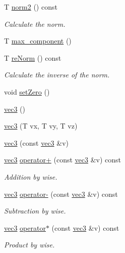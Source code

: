\begin{DoxyCompactItemize}
T \mbox{\hyperlink{struct_space_h_1_1vec3_a62dcbdc184d4228da839845c7e179eea}{norm2}} () const
\begin{DoxyCompactList}\small\item\em Calculate the norm. \end{DoxyCompactList}\item 
T \mbox{\hyperlink{struct_space_h_1_1vec3_a5bf7ae47f97a2269748d66933d719bd9}{max\+\_\+component}} ()
\item 
T \mbox{\hyperlink{struct_space_h_1_1vec3_a90d3f8ac98cf17cb20986997daaf9e0e}{re\+Norm}} () const
\begin{DoxyCompactList}\small\item\em Calculate the inverse of the norm. \end{DoxyCompactList}\item 
void \mbox{\hyperlink{struct_space_h_1_1vec3_ad2e7b91b843f84633372857718f1b5ba}{set\+Zero}} ()
\item 
\mbox{\hyperlink{struct_space_h_1_1vec3_adaeadb1aa964e9f603d2d2402bc0e29a}{vec3}} ()
\item 
\mbox{\hyperlink{struct_space_h_1_1vec3_a9441fda82b87e8b91167dc6e5e3039a2}{vec3}} (T vx, T vy, T vz)
\item 
\mbox{\hyperlink{struct_space_h_1_1vec3_ae3f72473af782f642108ed5c87263657}{vec3}} (const \mbox{\hyperlink{struct_space_h_1_1vec3}{vec3}} \&v)
\item 
\mbox{\hyperlink{struct_space_h_1_1vec3}{vec3}} \mbox{\hyperlink{struct_space_h_1_1vec3_a439dd37afaf3c046cd58b370b9d70b80}{operator+}} (const \mbox{\hyperlink{struct_space_h_1_1vec3}{vec3}} \&v) const
\begin{DoxyCompactList}\small\item\em Addition by wise. \end{DoxyCompactList}\item 
\mbox{\hyperlink{struct_space_h_1_1vec3}{vec3}} \mbox{\hyperlink{struct_space_h_1_1vec3_a8af5f368ccbf70d24d528592acfc6278}{operator-\/}} (const \mbox{\hyperlink{struct_space_h_1_1vec3}{vec3}} \&v) const
\begin{DoxyCompactList}\small\item\em Subtraction by wise. \end{DoxyCompactList}\item 
\mbox{\hyperlink{struct_space_h_1_1vec3}{vec3}} \mbox{\hyperlink{struct_space_h_1_1vec3_a5399298171d5e12e7b76ade00ab7d67d}{operator$\ast$}} (const \mbox{\hyperlink{struct_space_h_1_1vec3}{vec3}} \&v) const
\begin{DoxyCompactList}\small\item\em Product by wise. \end{DoxyCompactList}\item 

\end{DoxyCompactItemize}
